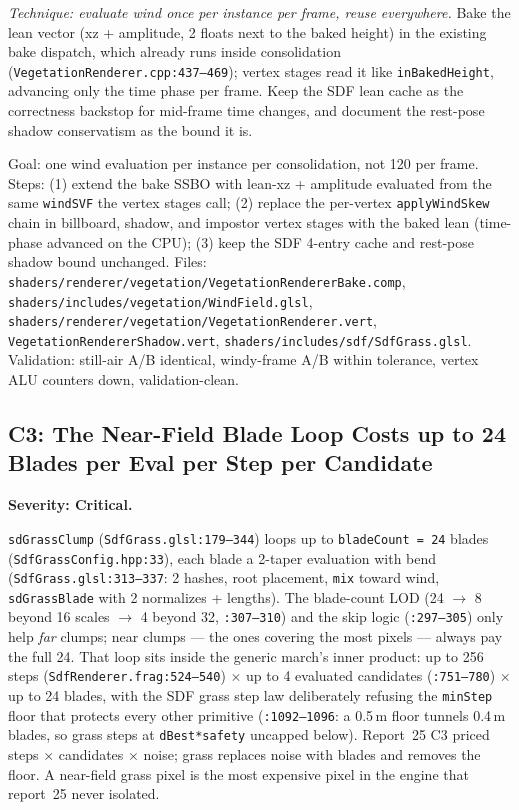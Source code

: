 \documentclass[11pt,a4paper]{article}
\begin{document}
\textit{Technique: evaluate wind once per instance per frame, reuse
everywhere.} Bake the lean vector (xz + amplitude, 2 floats next to the
baked height) in the existing bake dispatch, which already runs inside
consolidation (\texttt{VegetationRenderer.cpp:437--469}); vertex stages read
it like \texttt{inBakedHeight}, advancing only the time phase per frame.
Keep the SDF lean cache as the correctness backstop for mid-frame time
changes, and document the rest-pose shadow conservatism as the bound it is.

\begin{tcolorbox}[promptbox={Prompt --- C2: baked per-instance wind lean}]
Goal: one wind evaluation per instance per consolidation, not 120 per frame.
Steps: (1) extend the bake SSBO with lean-xz + amplitude evaluated from the
same \texttt{windSVF} the vertex stages call; (2) replace the per-vertex
\texttt{applyWindSkew} chain in billboard, shadow, and impostor vertex
stages with the baked lean (time-phase advanced on the CPU);
(3) keep the SDF 4-entry cache and rest-pose shadow bound unchanged.
Files: \texttt{shaders/renderer/vegetation/VegetationRendererBake.comp},
\texttt{shaders/includes/vegetation/WindField.glsl},
\texttt{shaders/renderer/vegetation/VegetationRenderer.vert},
\texttt{VegetationRendererShadow.vert},
\texttt{shaders/includes/sdf/SdfGrass.glsl}. Validation: still-air A/B
identical, windy-frame A/B within tolerance, vertex ALU counters down,
validation-clean.
\end{tcolorbox}

\subsection{C3: The Near-Field Blade Loop Costs up to 24 Blades per Eval per Step per Candidate}
\label{sec:c3}

\textbf{Severity: Critical.}

\texttt{sdGrassClump} (\texttt{SdfGrass.glsl:179--344}) loops up to
\texttt{bladeCount = 24} blades (\texttt{SdfGrassConfig.hpp:33}), each blade
a 2-taper evaluation with bend (\texttt{SdfGrass.glsl:313--337}: 2 hashes,
root placement, \texttt{mix} toward wind, \texttt{sdGrassBlade} with 2
normalizes + lengths). The blade-count LOD (24 $\rightarrow$ 8 beyond
16 scales $\rightarrow$ 4 beyond 32, \texttt{:307--310}) and the skip logic
(\texttt{:297--305}) only help \emph{far} clumps; near clumps --- the ones
covering the most pixels --- always pay the full 24. That loop sits inside
the generic march's inner product: up to 256 steps
(\texttt{SdfRenderer.frag:524--540}) $\times$ up to 4 evaluated candidates
(\texttt{:751--780}) $\times$ up to 24 blades, with the SDF grass step law
deliberately refusing the \texttt{minStep} floor that protects every other
primitive (\texttt{:1092--1096}: a 0.5\,m floor tunnels 0.4\,m blades, so
grass steps at \texttt{dBest*safety} uncapped below). Report~25 C3 priced
steps $\times$ candidates $\times$ noise; grass replaces noise with blades
and removes the floor. A near-field grass pixel is the most expensive pixel
in the engine that report~25 never isolated.
\end{document}
